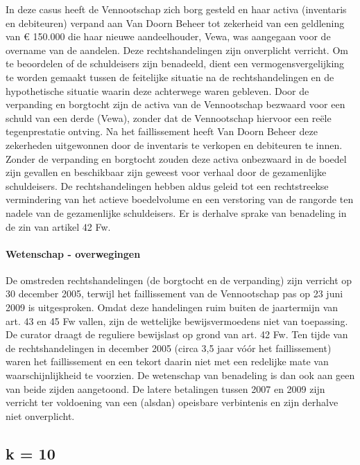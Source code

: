 \documentclass[
  dutch,
  a4paper,
]{article}
\begin{document}
In deze casus heeft de Vennootschap zich borg gesteld en haar activa (inventaris en debiteuren) verpand aan Van Doorn Beheer tot zekerheid van een geldlening van € 150.000 die haar nieuwe aandeelhouder, Vewa, was aangegaan voor de overname van de aandelen. Deze rechtshandelingen zijn onverplicht verricht. Om te beoordelen of de schuldeisers zijn benadeeld, dient een vermogensvergelijking te worden gemaakt tussen de feitelijke situatie na de rechtshandelingen en de hypothetische situatie waarin deze achterwege waren gebleven. Door de verpanding en borgtocht zijn de activa van de Vennootschap bezwaard voor een schuld van een derde (Vewa), zonder dat de Vennootschap hiervoor een reële tegenprestatie ontving. Na het faillissement heeft Van Doorn Beheer deze zekerheden uitgewonnen door de inventaris te verkopen en debiteuren te innen. Zonder de verpanding en borgtocht zouden deze activa onbezwaard in de boedel zijn gevallen en beschikbaar zijn geweest voor verhaal door de gezamenlijke schuldeisers. De rechtshandelingen hebben aldus geleid tot een rechtstreekse vermindering van het actieve boedelvolume en een verstoring van de rangorde ten nadele van de gezamenlijke schuldeisers. Er is derhalve sprake van benadeling in de zin van artikel 42 Fw.

\paragraph{Wetenschap - overwegingen}\label{wetenschap---overwegingen-5}

De omstreden rechtshandelingen (de borgtocht en de verpanding) zijn verricht op 30 december 2005, terwijl het faillissement van de Vennootschap pas op 23 juni 2009 is uitgesproken. Omdat deze handelingen ruim buiten de jaartermijn van art. 43 en 45 Fw vallen, zijn de wettelijke bewijsvermoedens niet van toepassing. De curator draagt de reguliere bewijslast op grond van art. 42 Fw. Ten tijde van de rechtshandelingen in december 2005 (circa 3,5 jaar vóór het faillissement) waren het faillissement en een tekort daarin niet met een redelijke mate van waarschijnlijkheid te voorzien. De wetenschap van benadeling is dan ook aan geen van beide zijden aangetoond. De latere betalingen tussen 2007 en 2009 zijn verricht ter voldoening van een (alsdan) opeisbare verbintenis en zijn derhalve niet onverplicht.

\newpage


\subsection{k = 10}\label{k-10}
\end{document}

